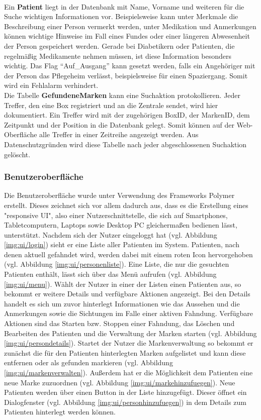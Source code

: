 \\Ein \textbf{Patient} liegt in der Datenbank mit Name, Vorname und weiteren für die Suche wichtigen Informationen vor. Beispielsweise kann unter Merkmale die Beschreibung einer Person vermerkt werden, unter Medikation und Anmerkungen können wichtige Hinweise im Fall eines Fundes oder einer längeren Abwesenheit der Person gespeichert werden. Gerade bei Diabetikern oder Patienten, die regelmäßig Medikamente nehmen müssen, ist diese Information besonders wichtig. Das Flag \enquote{Auf\_Ausgang} kann gesetzt werden, falls ein Angehöriger mit der Person das Pflegeheim verlässt, beispielsweise für einen Spaziergang. Somit wird ein Fehlalarm verhindert.
\\Die Tabelle \textbf{GefundeneMarken} kann eine Suchaktion protokollieren. Jeder Treffer, den eine Box registriert und an die Zentrale sendet, wird hier dokumentiert. Ein Treffer wird mit der zugehörigen BoxID, der MarkenID, dem Zeitpunkt und der Position in die Datenbank gelegt. Somit können auf der Web-Oberfläche alle Treffer in einer Zeitreihe angezeigt werden. Aus Datenschutzgründen wird diese Tabelle nach jeder abgeschlossenen Suchaktion gelöscht.

\subsubsection{Benutzeroberfläche}\label{sssec:ui}
Die Benutzeroberfläche wurde unter Verwendung des Frameworks Polymer erstellt. Dieses zeichnet sich vor allem dadurch aus, dass es die Erstellung eines "responsive UI", also einer Nutzerschnittstelle, die sich auf Smartphones, Tabletcomputern, Laptops sowie Desktop PC gleichermaßen bedienen lässt, unterstützt.\newline
Nachdem sich der Nutzer eingeloggt hat (vgl. Abbildung \ref{img:ui/login}) sieht er eine Liste aller Patienten im System. Patienten, nach denen aktuell gefahndet wird, werden dabei mit einem roten Icon hervorgehoben (vgl. Abbildung \ref{img:ui/personenliste}). Eine Liste, die nur die gesuchten Patienten enthält, lässt sich über das Menü aufrufen (vgl. Abbildung \ref{img:ui/menu}). \newline
Wählt der Nutzer in einer der Listen einen Patienten aus, so bekommt er weitere Details und verfügbare Aktionen angezeigt. Bei den Details handelt es sich um zuvor hinterlegt Informationen wie das Aussehen und die Anmerkungen sowie die Sichtungen im Falle einer aktiven Fahndung. Verfügbare Aktionen sind das Starten bzw. Stoppen einer Fahndung, das Löschen und Bearbeiten des Patienten und die Verwaltung der Marken starten (vgl. Abbildung \ref{img:ui/persondetails}). \newline
Startet der Nutzer die Markenverwaltung so bekommt er zunächst die für den Patienten hinterlegten Marken aufgelistet und kann diese entfernen oder als gefunden markieren (vgl. Abbildung \ref{img:ui/markenverwalten}). Außerdem hat er die Möglichkeit dem Patienten eine neue Marke zuzuordnen (vgl. Abbildung \ref{img:ui/markehinzufuegen}). \newline
Neue Patienten werden über einen Button in der Liste hinzugefügt. Dieser öffnet ein Dialogfenster (vgl. Abbildung \ref{img:ui/personhinzufuegen}) in dem Details zum Patienten hinterlegt werden können.

